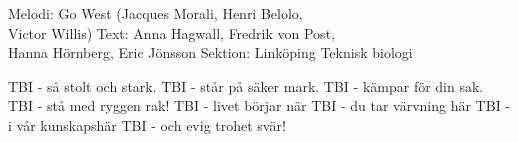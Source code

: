 \begin{song}

\begin{songmeta}
Melodi: Go West (Jacques Morali, Henri Belolo,\\ Victor Willis)
Text: Anna Hagwall, Fredrik von Post, \\Hanna Hörnberg, Eric Jönsson
Sektion: Linköping Teknisk biologi
\end{songmeta}

\begin{songtext}
TBI - så stolt och stark.
TBI - står på säker mark.
TBI - kämpar för din sak.
TBI - stå med ryggen rak!
TBI - livet börjar när
TBI - du tar värvning här
TBI - i vår kunskapshär
TBI - och evig trohet svär!
\end{songtext}
\end{song}
